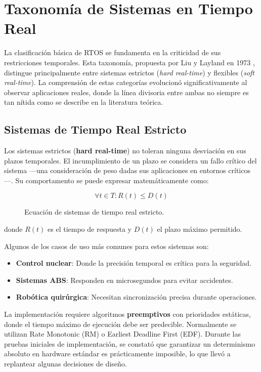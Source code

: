 \newpage
\section{Taxonomía de Sistemas en Tiempo Real}
    La clasificación básica de RTOS se fundamenta en la criticidad de sus restricciones temporales. Esta taxonomía, propuesta por Liu y Layland en 1973 \cite{Siewert_Pratt_2016}, distingue principalmente entre sistemas estrictos (\textit{hard real-time}) y flexibles (\textit{soft real-time}). La comprensión de estas categorías evolucionó significativamente al observar aplicaciones reales, donde la línea divisoria entre ambas no siempre es tan nítida como se describe en la literatura teórica.

    \subsection{Sistemas de Tiempo Real Estricto}
        Los sistemas estrictos (\textbf{hard real-time}) no toleran ninguna desviación en sus plazos temporales. El incumplimiento de un plazo se considera un fallo crítico del sistema —una consideración de peso dadas sus aplicaciones en entornos críticos—. Su comportamento se puede expresar matemáticamente como:

        \begin{figure}[h!]
            \centering
            \begin{equation}
                \forall t \in T: R(t) \leq D(t)
            \end{equation}
            \caption{Ecuación de sistemas de tiempo real estricto.}
            \label{fig:hard_real_time_equation}
        \end{figure}

        donde $R(t)$ es el tiempo de respuesta y $D(t)$ el plazo máximo permitido.

        Algunos de los casos de uso más comunes para estos sistemas son:
        \begin{itemize}
            \item \textbf{Control nuclear}: Donde la precisión temporal es crítica para la seguridad.
            \item \textbf{Sistemas ABS}: Responden en microsegundos para evitar accidentes.
            \item \textbf{Robótica quirúrgica}: Necesitan sincronización precisa durante operaciones.
        \end{itemize}

    La implementación requiere algoritmos \textbf{preemptivos} con prioridades estáticas, donde el tiempo máximo de ejecución debe ser predecible. Normalmente se utilizan Rate Monotonic (RM) o Earliest Deadline First (EDF). Durante las pruebas iniciales de implementación, se constató que garantizar un determinismo absoluto en hardware estándar es prácticamente imposible, lo que llevó a replantear algunas decisiones de diseño.

